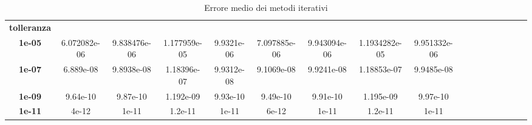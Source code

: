 \begin{table}[!ht]
\begin{subtable}[!ht]{1\textwidth}
{\begin{tabular}{|c|c|c|c|c|c|c|c|c|c|c|c|c|c|c|c|c|}
                \textbf{tolleranza} & ~                 & ~                 & ~             & ~             & ~                 & ~                 & ~             & ~             \\
                \textbf{1e-05}      & 6.072082e-06      & 9.838476e-06      & 1.177959e-05  & 9.9321e-06    & 7.097885e-06      & 9.943094e-06      & 1.1934282e-05 & 9.951332e-06  \\
                \textbf{1e-07}      & 6.889e-08         & 9.8938e-08        & 1.18396e-07   & 9.9312e-08    & 9.1069e-08        & 9.9241e-08        & 1.18853e-07   & 9.9485e-08    \\
                \textbf{1e-09}      & 9.64e-10          & 9.87e-10          & 1.192e-09     & 9.93e-10      & 9.49e-10          & 9.91e-10          & 1.195e-09     & 9.97e-10      \\
                \textbf{1e-11}      & 4e-12             & 1e-11             & 1.2e-11       & 1e-11         & 6e-12             & 1e-11             & 1.2e-11       & 1e-11         \\
            \end{tabular}}
        \caption{Vem 1 e Vem 2}
        \label{tab:vem_error}
    \end{subtable}
    \caption{Errore medio dei metodi iterativi}
    \label{tab:erors}
\end{table}
